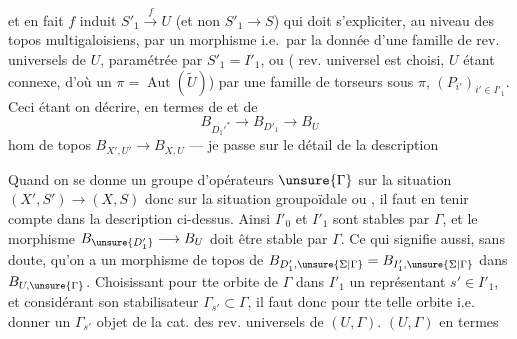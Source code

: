 et en fait $f$ induit $S'_1\xrightarrow{f}U$ (et non $S'_1\longrightarrow S$) qui doit s'expliciter, au niveau  des topos multigaloisiens, par un morphisme
i.e.\ par la donnée d'une famille de rev. universels de $U$, paramétrée par $S'_1=I'_1$, ou ( rev. universel est choisi, $U$ étant connexe, d'où un $\pi=\operatorname{Aut}(\widetilde U)$) par une famille de torseurs sous  $\pi$, $(P_{i'})_{i'\in I'_1}$.
Ceci étant   on  décrire, en termes de
et de
\[
B_{D_1'^*}\longrightarrow B_{D'_1}\longrightarrow B_U
\]
  hom de topos $B_{X',U'}\longrightarrow B_{X,U}$
--- je passe sur le détail de la description


Quand on se donne un groupe d'opérateurs $\unsure{\Gamma}$ sur la situation $(X',S')\longrightarrow(X,S)$ donc sur la situation groupoïdale ou , il faut en tenir compte dans la description ci-dessus.
Ainsi $I'_0$ et $I'_1$ sont stables par $\Gamma$, et le morphisme  $B_{\unsure{D'_1}}\longrightarrow B_U$ doit être stable par $\Gamma$.
Ce qui signifie aussi, sans doute, qu'on a un morphisme de topos de
$B_{D'_1,\unsure{\Sigma|\Gamma}}=B_{I'_1,\unsure{\Sigma|\Gamma}}$
dans $B_{U,\unsure{\Gamma}}$.
Choisissant pour tte orbite de $\Gamma$ dans $I'_1$ un représentant $s'\in I'_1$, et considérant son stabilisateur $\Gamma_{s'}\subset\Gamma$, il faut donc pour tte telle orbite i.e.\    donner un $\Gamma_{s'}$ objet de la cat. des rev. universels de $(U,\Gamma)$.
   $(U,\Gamma)$ en termes

